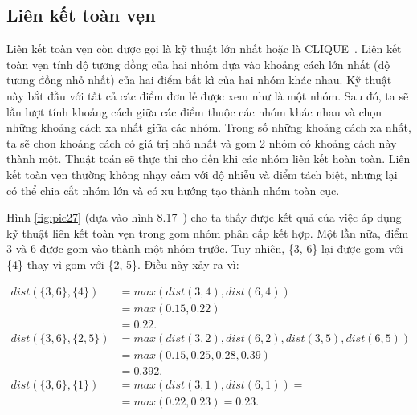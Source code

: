 \subsection{Liên kết toàn vẹn}		
Liên kết toàn vẹn còn được gọi là kỹ thuật lớn nhất hoặc là CLIQUE~\cite{Vipin-Kumar, HAC, AHC, hierarchical-clustering, single-complete}.
Liên kết toàn vẹn tính độ tương đồng của hai nhóm dựa vào khoảng cách lớn nhất (độ tương đồng nhỏ nhất) của hai điểm bất kì của hai nhóm khác nhau.
Kỹ thuật này bắt đầu với tất cả các điểm đơn lẻ được xem như là một nhóm.
Sau đó, ta sẽ lần lượt tính khoảng cách giữa các điểm thuộc các nhóm khác nhau và chọn những khoảng cách xa nhất giữa các nhóm.
Trong số những khoảng cách xa nhất, ta sẽ chọn khoảng cách có giá trị nhỏ nhất và gom 2 nhóm có khoảng cách này thành một.
Thuật toán sẽ thực thi cho đến khi các nhóm liên kết hoàn toàn.
Liên kết toàn vẹn thường không nhạy cảm với độ nhiễu và điểm tách biệt, nhưng lại có thể chia cắt nhóm lớn và có xu hướng tạo thành nhóm toàn cục.

Hình \ref{fig:pic27} (dựa vào hình 8.17~\cite{Vipin-Kumar}) cho ta thấy được kết quả của việc áp dụng kỹ thuật liên kết toàn vẹn trong gom nhóm phân cấp kết hợp.
Một lần nữa, điểm 3 và 6 được gom vào thành một nhóm trước.
Tuy nhiên, \{3, 6\} lại được gom với \{4\} thay vì gom với \{2, 5\}.
Điều này xảy ra vì:

\begin{equation}
\begin{aligned}
dist(\{3, 6\}, \{4\})
&= max(dist(3, 4), dist(6, 4)) 		\\
&= max(0.15, 0.22) 					\\
&= 0.22.							\\
dist(\{3, 6\}, \{2, 5\})
&= max(dist(3, 2), dist(6, 2), dist(3, 5), dist(6, 5))			\\
&= max(0.15, 0.25, 0.28, 0.39)									\\
&= 0.392.										\\					
dist(\{3, 6\}, \{1\})
&= max(dist(3, 1), dist(6, 1)) =	\\ 
&= max(0.22, 0.23) = 0.23.		\\
\end{aligned}
\end{equation}

